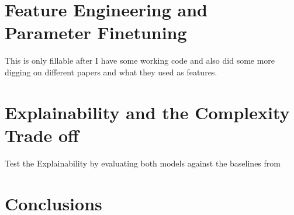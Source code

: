 \documentclass[11pt,a4paper]{article}
\begin{document}
\section{Feature Engineering and Parameter Finetuning}
This is only fillable after I have some working code and also did some more digging on different papers and what they used as features.

\section{Explainability and the Complexity Trade off}
Test the Explainability by evaluating both models against the baselines from \cite{HateXplain}

\section{Conclusions}



\printbibliography
\end{document}
